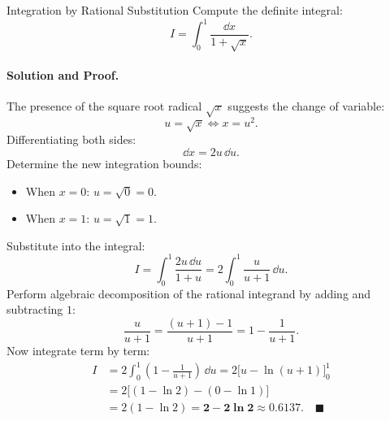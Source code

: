 \begin{workedexample}{Integration by Rational Substitution}
Compute the definite integral:
\[
I = \int_0^1 \frac{\dd x}{1 + \sqrt{x}}.
\]

\paragraph{Solution and Proof.}
The presence of the square root radical $\sqrt{x}$ suggests the change of variable:
\[
u = \sqrt{x} \iff x = u^2.
\]
Differentiating both sides:
\[
\dd x = 2u\,\dd u.
\]
Determine the new integration bounds:
\begin{itemize}[itemsep=1pt]
  \item When $x = 0$: $u = \sqrt{0} = 0$.
  \item When $x = 1$: $u = \sqrt{1} = 1$.
\end{itemize}
Substitute into the integral:
\[
I = \int_0^1 \frac{2u\,\dd u}{1 + u} = 2 \int_0^1 \frac{u}{u + 1}\,\dd u.
\]
Perform algebraic decomposition of the rational integrand by adding and subtracting $1$:
\[
\frac{u}{u + 1} = \frac{(u + 1) - 1}{u + 1} = 1 - \frac{1}{u + 1}.
\]
Now integrate term by term:
\begin{align*}
I &= 2 \int_0^1 \left( 1 - \frac{1}{u + 1} \right)\,\dd u = 2 \Big[ u - \ln(u + 1) \Big]_0^1 \\
  &= 2 \Big[ (1 - \ln 2) - (0 - \ln 1) \Big] \\
  &= 2(1 - \ln 2) = \mathbf{2 - 2 \ln 2} \approx \mathbf{0.6137}. \quad \blacksquare
\end{align*}
\end{workedexample}
